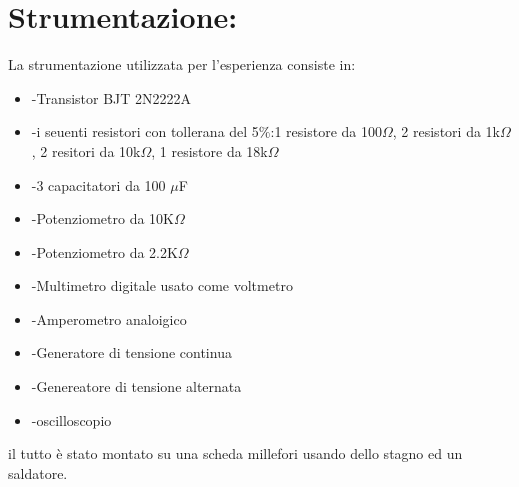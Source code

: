\documentclass{article}
\begin{document}
\section{Strumentazione:}
La strumentazione utilizzata per l'esperienza consiste in:
\begin{itemize}
    \item -Transistor BJT  2N2222A
    \item -i seuenti resistori con tollerana del 5$\%$:1 resistore da 100$\Omega$, 2 resistori da 1k$\Omega$, 2 resitori da 10k$\Omega$, 1 resistore da 18k$\Omega$
    \item -3 capacitatori da 100 $\mu$F
    \item -Potenziometro da 10K$\Omega$
    \item -Potenziometro da 2.2K$\Omega$
    \item -Multimetro digitale usato come voltmetro
    \item -Amperometro analoigico
    \item -Generatore di tensione continua
    \item -Genereatore di tensione alternata
    \item -oscilloscopio
\end{itemize}
il tutto è stato montato su una scheda millefori usando dello stagno ed un saldatore.
~
\end{document}
